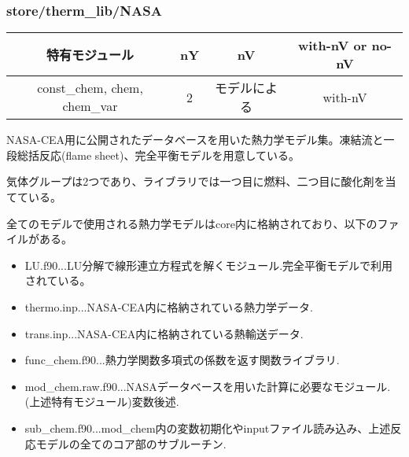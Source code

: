\documentclass{jsarticle}
\begin{document}
\subsubsection{store/therm\_lib/NASA}%

\begin{center}
\begin{tabular}{cccc}\hline
特有モジュール               & nY &            nV & with-nV or no-nV\\\hline
const\_chem, chem, chem\_var &  2 &  モデルによる & with-nV\\
\hline
\end{tabular}
\end{center}

NASA-CEA用に公開されたデータベースを用いた熱力学モデル集。凍結流と一段総括反応(flame sheet)、完全平衡モデルを用意している。

気体グループは2つであり、ライブラリでは一つ目に燃料、二つ目に酸化剤を当てている。

全てのモデルで使用される熱力学モデルはcore内に格納されており、以下のファイルがある。
\begin{itemize}
\item LU.f90...LU分解で線形連立方程式を解くモジュール.完全平衡モデルで利用されている。
\item thermo.inp...NASA-CEA内に格納されている熱力学データ.
\item trans.inp...NASA-CEA内に格納されている熱輸送データ.
\item func\_chem.f90...熱力学関数多項式の係数を返す関数ライブラリ.
\item mod\_chem.raw.f90...NASAデータベースを用いた計算に必要なモジュール.(上述特有モジュール)変数後述.
\item sub\_chem.f90...mod\_chem内の変数初期化やinputファイル読み込み、上述反応モデルの全てのコア部のサブルーチン.
\end{itemize}
\end{document}
